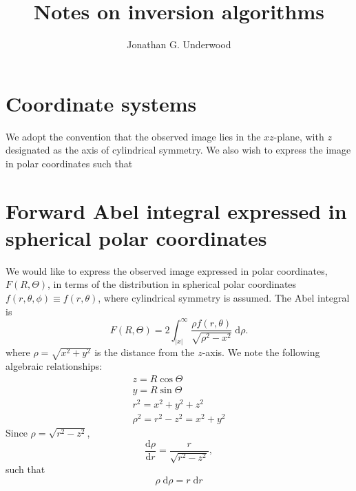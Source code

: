 \documentclass{article}
\title{Notes on inversion algorithms}
\author {Jonathan G. Underwood}
\begin{document}
\section{Coordinate systems}
We adopt the convention that the observed image lies in the $xz$-plane, with
$z$ designated as the axis of cylindrical symmetry. We also wish to express
the image in polar coordinates such that



\section{Forward Abel integral expressed in spherical polar coordinates} 

We would like to express the observed image expressed in polar coordinates,
$F(R, \Theta)$, in terms of the distribution in spherical polar coordinates
$f(r, \theta, \phi)\equiv f(r, \theta)$, where cylindrical symmetry is
assumed. The Abel integral is
\begin{equation}
  \label{eq:1}
  F(R, \Theta)=2\int_{|x|}^\infty
  \frac{\rho f(r, \theta)}{\sqrt{\rho^2-x^2}}\;\mathrm{d}\rho.
\end{equation}
where $\rho=\sqrt{x^2+y^2}$ is the distance from the $z$-axis. We note the
following algebraic relationships:
\begin{gather}
  z=R\cos\Theta\\
  y=R\sin\Theta\\
  r^2=x^2+y^2+z^2\\
  \rho^2=r^2-z^2=x^2+y^2
\end{gather}
Since $\rho=\sqrt{r^2-z^2}$,
\begin{equation}
  \label{eq:2}
  \frac{\mathrm{d}\rho}{\mathrm{d}r}=
  \frac{r}{\sqrt{r^2-z^2}},
\end{equation}
such that
\begin{equation}
  \label{eq:3}
  \rho\;\mathrm{d}\rho=r\;\mathrm{d}r
\end{equation}
\end{document}

